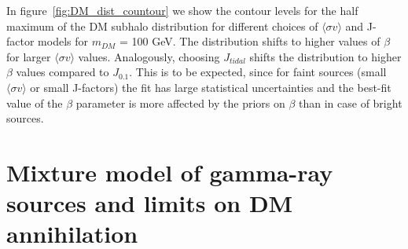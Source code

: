 \documentclass[12pt, a4paper]{article}
\newcommand{\sigmav}{\langle \sigma v \rangle}
\begin{document}
In figure~\ref{fig:DM_dist_countour} we show the contour levels for the half maximum of the DM subhalo distribution for different choices of $\sigmav$ and J-factor models for $m_{DM}$ = 100 GeV. 
The distribution shifts to higher values of $\beta$ for larger $\sigmav$ values. Analogously, choosing $J_{tidal}$ shifts the distribution to higher $\beta$ values compared to $J_{0.1}$.
This is to be expected, since for faint sources (small $\sigmav$ or small J-factors) the fit has large statistical uncertainties and the best-fit value of the $\beta$ parameter is more affected by the priors on $\beta$ than in case of bright sources.



\section{Mixture model of gamma-ray sources and limits on DM annihilation}
\label{sec:results}
\end{document}
